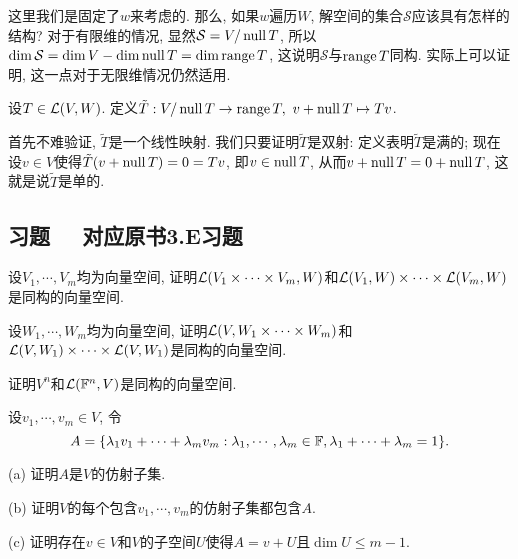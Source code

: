 这里我们是固定了$w$来考虑的. 那么, 如果$w$遍历$W$, 解空间的集合$\mathcal{S}$应该具有怎样的结构? 对于有限维的情况, 显然$\mathcal{S}=V/\operatorname{null} T$, 所以$\dim \mathcal{S} = \dim V - \dim \operatorname{null} T = \dim \operatorname{range} T$, 这说明$\mathcal{S}$与$\operatorname{range} T$同构. 实际上可以证明, 这一点对于无限维情况仍然适用. 

\begin{definition}{}
	设$T \in \mathcal{L} (V,W)$. 定义$\tilde{T}:V/\operatorname{null} T \to \operatorname{range} T,~v+\operatorname{null} T \mapsto Tv$. 
\end{definition}

首先不难验证, $\tilde{T}$是一个线性映射. 我们只要证明$\tilde{T}$是双射: 定义表明$\tilde{T}$是满的; 现在设$v \in V$使得$\tilde{T}(v+\operatorname{null} T)=0=Tv$, 即$v \in \operatorname{null} T$, 从而$v+\operatorname{null} T = 0 +\operatorname{null} T$, 这就是说$\tilde{T}$是单的. 

\subsection*{习题  ~~\small 对应原书3.E习题}

\begin{exercise} %
	设$V_1,\cdots ,V_m$均为向量空间, 证明$\mathcal{L} (V_1 \times \cdots \times V_m,W)$和$\mathcal{L} (V_1,W) \times \cdots \times \mathcal{L} (V_m,W)$是同构的向量空间. 
\end{exercise}
\vspace{1em}

\begin{exercise} %
	设$W_1,\cdots ,W_m$均为向量空间, 证明$\mathcal{L} (V, W_1 \times \cdots \times W_m)$和$\mathcal{L} (V,W_1) \times \cdots \times \mathcal{L} (V,W_1)$是同构的向量空间. 
\end{exercise}
\vspace{1em}

\begin{exercise} %
	证明$V^n$和$\mathcal{L} (\mathbb{F} ^n,V)$是同构的向量空间. 
\end{exercise}
\vspace{1em}

\begin{exercise} %
	设$v_1,\cdots ,v_m \in V$, 令$$A = \{ \lambda _1v_1+\cdots + \lambda _mv_m: \lambda _1,\cdots ,\lambda _m \in \mathbb{F}, \lambda _1 + \cdots + \lambda _m=1 \}.$$
	
	(a) 证明$A$是$V$的仿射子集. 
	
	(b) 证明$V$的每个包含$v_1,\cdots ,v_m$的仿射子集都包含$A$. 
	
	(c) 证明存在$v \in V$和$V$的子空间$U$使得$A=v+U$且$\dim U \leq m-1$. 
\end{exercise}
\vspace{1em}

